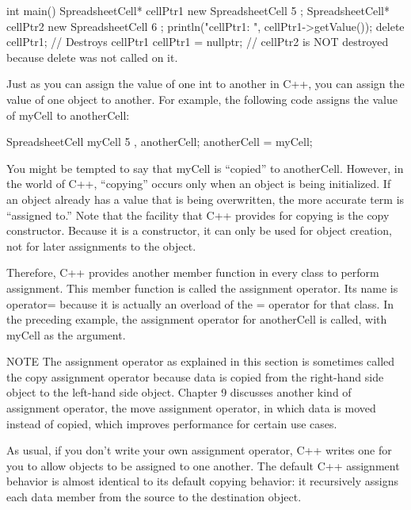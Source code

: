 \begin{cpp}
int main()
{
    SpreadsheetCell* cellPtr1 { new SpreadsheetCell { 5 } };
    SpreadsheetCell* cellPtr2 { new SpreadsheetCell { 6 } };
    println("cellPtr1: {}", cellPtr1->getValue());
    delete cellPtr1; // Destroys cellPtr1
    cellPtr1 = nullptr;
} // cellPtr2 is NOT destroyed because delete was not called on it.
\end{cpp}



Just as you can assign the value of one int to another in C++, you can assign the value of one object to another. For example, the following code assigns the value of myCell to anotherCell:

\begin{cpp}
SpreadsheetCell myCell { 5 }, anotherCell;
anotherCell = myCell;
\end{cpp}

You might be tempted to say that myCell is “copied” to anotherCell. However, in the world of C++, “copying” occurs only when an object is being initialized. If an object already has a value that is being overwritten, the more accurate term is “assigned to.” Note that the facility that C++ provides for copying is the copy constructor. Because it is a constructor, it can only be used for object creation, not for later assignments to the object.

Therefore, C++ provides another member function in every class to perform assignment. This member function is called the assignment operator. Its name is operator= because it is actually an overload of the = operator for that class. In the preceding example, the assignment operator for anotherCell is called, with myCell as the argument.

\begin{myNotic}{NOTE}
The assignment operator as explained in this section is sometimes called the copy assignment operator because data is copied from the right-hand side object to the left-hand side object. Chapter 9 discusses another kind of assignment operator, the move assignment operator, in which data is moved instead of copied, which improves performance for certain use cases.
\end{myNotic}

As usual, if you don’t write your own assignment operator, C++ writes one for you to allow objects to be assigned to one another. The default C++ assignment behavior is almost identical to its default copying behavior: it recursively assigns each data member from the source to the destination object.

